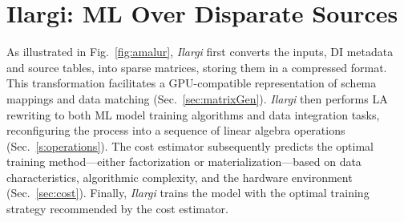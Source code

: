 


\vspace{-3mm}
\section{Ilargi: ML Over Disparate Sources}
\label{sec:system}


\vspace{-3mm}
As illustrated in Fig.~\ref{fig:amalur}, \emph{Ilargi} first converts the inputs, DI metadata and source tables, into sparse matrices, storing them in a compressed format. This transformation facilitates a GPU-compatible representation of schema mappings and data matching  (Sec.~\ref{sec:matrixGen}). \emph{Ilargi} then performs LA rewriting to both ML model training algorithms and data integration tasks, reconfiguring the process into a sequence of linear algebra operations (Sec.~\ref{s:operations}). The cost estimator subsequently predicts the optimal training method—either factorization or materialization—based on data characteristics, algorithmic complexity, and the hardware environment (Sec.~\ref{sec:cost}). Finally, \emph{Ilargi} trains the model with the optimal training strategy recommended by the cost estimator.

